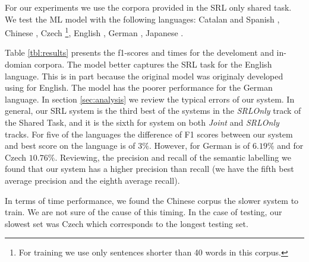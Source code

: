 For our experiments we use the corpora provided in the SRL only shared task. We 
test the ML model with the following languages: Catalan and Spanish 
\citep{catalan-and-spanish-data} , Chinese \citep{chinese-data}, Czech 
\citep{czech-data}\footnote{For training we use only sentences shorter than 40 
words in this corpus.}, English \citep{english-data}, German 
\citep{german-data}, Japanese \citep{japanese-data}. 

Table \ref{tbl:results} presents the f1-scores and times for the develoment and
in-domian corpora. The model better captures the SRL task for the English 
language. This is in part because the original model was originaly developed 
using for English. The model has the poorer performance for the German language.  
In section \ref{sec:analysis} we review the typical errors of our system. In 
general, our SRL system is the third best of the systems in the \emph{SRLOnly} 
track of the Shared Task, and it is the sixth for system on both \emph{Joint} 
and \emph{SRLOnly} tracks. For five of the languages the difference of F1 scores 
between our system and best score on the language is of $3\%$.  However, for 
German is of  $6.19\%$ and for Czech $10.76\%$.  Reviewing, the precision and 
recall of the semantic labelling we found that our system has a higher precision 
than recall (we have the fifth best average precision and the eighth average 
recall).

In terms of time performance, we found the Chinese corpus the slower system to 
train. We are not sure of the cause of this timing. In the case of testing, our 
slowest set was Czech which corresponds to the longest testing set. 

